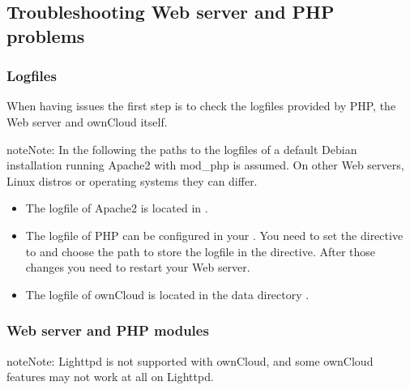 \documentclass[letterpaper,10pt,english]{sphinxmanual}
\begin{document}
\subsection{Troubleshooting Web server and PHP problems}
\label{issues/general_troubleshooting:troubleshooting-web-server-and-php-problems}

\subsubsection{Logfiles}
\label{issues/general_troubleshooting:logfiles}
When having issues the first step is to check the logfiles provided by PHP, the
Web server and ownCloud itself.

\begin{notice}{note}{Note:}
In the following the paths to the logfiles of a default Debian
installation running Apache2 with mod\_php is assumed. On other Web servers,
Linux distros or operating systems they can differ.
\end{notice}
\begin{itemize}
\item {} 
The logfile of Apache2 is located in .

\item {} 
The logfile of PHP can be configured in your .
You need to set the directive  to  and choose the path
to store the logfile in the  directive. After those changes you
need to restart your Web server.

\item {} 
The logfile of ownCloud is located in the data directory
.

\end{itemize}


\subsubsection{Web server and PHP modules}
\label{issues/general_troubleshooting:web-server-and-php-modules}
\begin{notice}{note}{Note:}
Lighttpd is not supported with ownCloud, and some ownCloud features
may not work at all on Lighttpd.
\end{notice}
\end{document}
